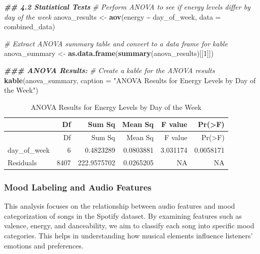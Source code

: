 \documentclass[
]{article}
\newenvironment{Shaded}{\begin{snugshade}}{\end{snugshade}}
\newcommand{\AttributeTok}[1]{\textcolor[rgb]{0.13,0.29,0.53}{#1}}
\newcommand{\CommentTok}[1]{\textcolor[rgb]{0.56,0.35,0.01}{\textit{#1}}}
\newcommand{\DecValTok}[1]{\textcolor[rgb]{0.00,0.00,0.81}{#1}}
\newcommand{\DocumentationTok}[1]{\textcolor[rgb]{0.56,0.35,0.01}{\textbf{\textit{#1}}}}
\newcommand{\FunctionTok}[1]{\textcolor[rgb]{0.13,0.29,0.53}{\textbf{#1}}}
\newcommand{\NormalTok}[1]{#1}
\newcommand{\OtherTok}[1]{\textcolor[rgb]{0.56,0.35,0.01}{#1}}
\newcommand{\SpecialCharTok}[1]{\textcolor[rgb]{0.81,0.36,0.00}{\textbf{#1}}}
\newcommand{\StringTok}[1]{\textcolor[rgb]{0.31,0.60,0.02}{#1}}
\begin{document}
\begin{Shaded}
\begin{Highlighting}[]
\DocumentationTok{\#\# 4.2 Statistical Tests}
\CommentTok{\# Perform ANOVA to see if energy levels differ by day of the week}
\NormalTok{anova\_results }\OtherTok{\textless{}{-}} \FunctionTok{aov}\NormalTok{(energy }\SpecialCharTok{\textasciitilde{}}\NormalTok{ day\_of\_week, }\AttributeTok{data =}\NormalTok{ combined\_data)}

\CommentTok{\# Extract ANOVA summary table and convert to a data frame for kable}
\NormalTok{anova\_summary }\OtherTok{\textless{}{-}} \FunctionTok{as.data.frame}\NormalTok{(}\FunctionTok{summary}\NormalTok{(anova\_results)[[}\DecValTok{1}\NormalTok{]])}

\DocumentationTok{\#\#\# ANOVA Results:}
\CommentTok{\# Create a kable for the ANOVA results}
\FunctionTok{kable}\NormalTok{(anova\_summary, }\AttributeTok{caption =} \StringTok{"ANOVA Results for Energy Levels by Day of the Week"}\NormalTok{)}
\end{Highlighting}
\end{Shaded}

\begin{longtable}[]{@{}lrrrrr@{}}
\caption{ANOVA Results for Energy Levels by Day of the
Week}\tabularnewline
\toprule\noalign{}
& Df & Sum Sq & Mean Sq & F value & Pr(\textgreater F) \\
\midrule\noalign{}
\endfirsthead
\toprule\noalign{}
& Df & Sum Sq & Mean Sq & F value & Pr(\textgreater F) \\
\midrule\noalign{}
\endhead
\bottomrule\noalign{}
\endlastfoot
day\_of\_week & 6 & 0.4823289 & 0.0803881 & 3.031174 & 0.0058171 \\
Residuals & 8407 & 222.9575702 & 0.0265205 & NA & NA \\
\end{longtable}

\subsubsection{Mood Labeling and Audio
Features}\label{mood-labeling-and-audio-features}

This analysis focuses on the relationship between audio features and
mood categorization of songs in the Spotify dataset. By examining
features such as valence, energy, and danceability, we aim to classify
each song into specific mood categories. This helps in understanding how
musical elements influence listeners' emotions and preferences.
\end{document}

